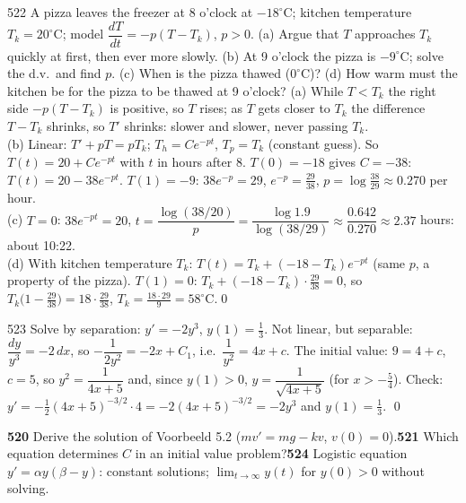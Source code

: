 \begin{bookex}{522}
A pizza leaves the freezer at 8 o'clock at $-18^\circ$C; kitchen temperature $T_k=20^\circ$C; model $\dfrac{dT}{dt}=-p(T-T_k)$, $p>0$. (a) Argue that $T$ approaches $T_k$ quickly at first, then ever more slowly. (b) At 9 o'clock the pizza is $-9^\circ$C; solve the d.v.\ and find $p$. (c) When is the pizza thawed ($0^\circ$C)? (d) How warm must the kitchen be for the pizza to be thawed at 9 o'clock?
\solution
(a) While $T<T_k$ the right side $-p(T-T_k)$ is positive, so $T$ rises; as $T$ gets closer to $T_k$ the difference $T-T_k$ shrinks, so $T'$ shrinks: slower and slower, never passing $T_k$.\\
(b) Linear: $T'+pT=pT_k$; $T_h=Ce^{-pt}$, $T_p=T_k$ (constant guess). So $T(t)=20+Ce^{-pt}$ with $t$ in hours after 8. $T(0)=-18$ gives $C=-38$: $T(t)=20-38e^{-pt}$. $T(1)=-9$: $38e^{-p}=29$, $e^{-p}=\frac{29}{38}$, $p=\log\frac{38}{29}\approx0.270$ per hour.\\
(c) $T=0$: $38e^{-pt}=20$, $t=\dfrac{\log(38/20)}{p}=\dfrac{\log1.9}{\log(38/29)}\approx\dfrac{0.642}{0.270}\approx2.37$ hours: about 10:22.\\
(d) With kitchen temperature $T_k$: $T(t)=T_k+(-18-T_k)e^{-pt}$ (same $p$, a property of the pizza). $T(1)=0$: $T_k+(-18-T_k)\cdot\frac{29}{38}=0$, so $T_k\big(1-\frac{29}{38}\big)=18\cdot\frac{29}{38}$, $T_k=\frac{18\cdot29}{9}=58^\circ$C.\qed
\end{bookex}

\begin{bookex}{523}
Solve by separation: $y'=-2y^3$, $y(1)=\frac13$.
\solution
Not linear, but separable: $\dfrac{dy}{y^3}=-2\,dx$, so $-\dfrac1{2y^2}=-2x+C_1$, i.e.\ $\dfrac1{y^2}=4x+c$. The initial value: $9=4+c$, $c=5$, so $y^2=\dfrac1{4x+5}$ and, since $y(1)>0$, $y=\dfrac1{\sqrt{4x+5}}$ (for $x>-\frac54$). Check: $y'=-\frac12(4x+5)^{-3/2}\cdot4=-2(4x+5)^{-3/2}=-2y^3$ and $y(1)=\frac13$. \checkmark\qed
\end{bookex}

\begin{trybox}[{520, 521, 524}]
\textbf{520} Derive the solution of Voorbeeld 5.2 ($mv'=mg-kv$, $v(0)=0$).\quad \textbf{521} Which equation determines $C$ in an initial value problem?\quad \textbf{524} Logistic equation $y'=\alpha y(\beta-y)$: constant solutions; $\lim_{t\to\infty}y(t)$ for $y(0)>0$ without solving.
\end{trybox}

